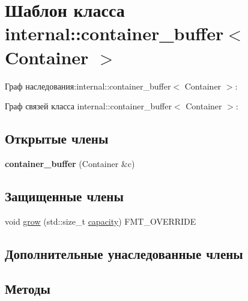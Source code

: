 \hypertarget{classinternal_1_1container__buffer}{}\section{Шаблон класса internal\+:\+:container\+\_\+buffer$<$ Container $>$}
\label{classinternal_1_1container__buffer}


Граф наследования\+:internal\+:\+:container\+\_\+buffer$<$ Container $>$\+:


Граф связей класса internal\+:\+:container\+\_\+buffer$<$ Container $>$\+:
\subsection*{Открытые члены}
\begin{DoxyCompactItemize}
\item 
\mbox{\label{classinternal_1_1container__buffer_a20f1b1924bb4bf09e5530fc3132b7628}} 
{\bfseries container\+\_\+buffer} (Container \&c)
\end{DoxyCompactItemize}
\subsection*{Защищенные члены}
\begin{DoxyCompactItemize}
\item 
void \hyperlink{classinternal_1_1container__buffer_a9dc9c633e12053ddf07af13b30b378b3}{grow} (std\+::size\+\_\+t \hyperlink{classinternal_1_1buffer_ab71f52fc20af6ed2a15f75143c89e2a4}{capacity}) F\+M\+T\+\_\+\+O\+V\+E\+R\+R\+I\+DE
\end{DoxyCompactItemize}
\subsection*{Дополнительные унаследованные члены}


\subsection{Методы}
\mbox{\label{classinternal_1_1container__buffer_a9dc9c633e12053ddf07af13b30b378b3}} 
